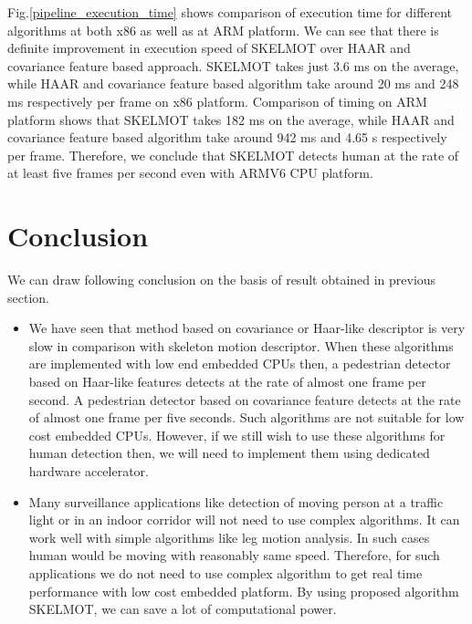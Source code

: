 \indent Fig.\ref{pipeline_execution_time} shows comparison of execution
time for different algorithms at both x86 as well as at ARM platform. We
can see that there is definite improvement in execution speed of SKELMOT
over HAAR and covariance feature based approach. SKELMOT takes just 3.6
ms on the average, while HAAR and covariance feature based algorithm
take around 20 ms and 248 ms respectively per frame on x86 platform.
Comparison of timing on ARM platform shows that SKELMOT takes 182 ms on
the average, while HAAR and covariance feature based algorithm take
around 942 ms and 4.65 s respectively per frame. Therefore, we conclude
that SKELMOT detects human at the rate of at least five frames per second
even with ARMV6 CPU platform.
\section{Conclusion}
\indent We can draw following conclusion on the basis of result obtained 
in previous section.
\begin{itemize}
 \item We have seen that method based on covariance or
 Haar-like descriptor is very slow in comparison with
 skeleton motion descriptor. When these algorithms are
 implemented with low end embedded CPUs then, a
 pedestrian detector based on Haar-like features detects
 at the rate of almost one frame per second. A pedestrian
 detector based on covariance feature detects at the rate
 of almost one frame per five seconds. Such algorithms
 are not suitable for low cost embedded CPUs. However, if
 we still wish to use these algorithms for human
 detection then, we will need to implement them using
 dedicated hardware accelerator.
 \item Many surveillance applications like detection of moving
 person at a traffic light or in an indoor corridor will
 not need to use complex algorithms. It can work well with
 simple algorithms like leg motion analysis. In such cases
 human would be moving with reasonably same speed. Therefore,
 for such applications we do not need to use complex algorithm
 to get real time performance with low cost embedded platform.
 By using proposed algorithm SKELMOT, we can save a lot of
 computational power.
\end{itemize}
